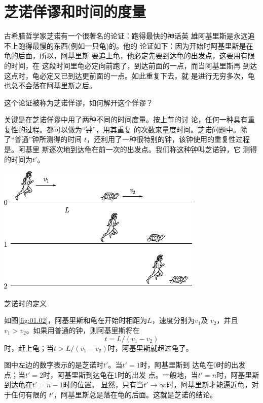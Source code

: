\section{芝诺佯谬和时间的度量}\label{sec:01.02}

古希腊哲学家芝诺有一个很著名的论证：跑得最快的神话英
雄阿基里斯是永远追不上跑得最慢的东西(例如一只龟)的。他的
论证如下：因为开始时阿基里斯是在龟的后面，所以，阿基里斯
要追上龟，他必定先要到达龟的出发点，这要用有限的时间，在
这段时间里龟必定向前跑了，到达前面的一点，而当阿基里斯再
到达这点时，龟必定又已到达更前面的一点。如此重复下去，就
是进行无穷多次，龟也总不会落在阿基里斯之后。

这个论证被称为芝诺佯谬，如何解开这个佯谬？

关键是在芝诺佯谬中用了两种不同的时间度量。按上节的讨
论，任何一种具有重复性的过程。都可以做为“钟”，用其重复
的次数来量度时间。芝诺问题中。除了“普通”钟所测得的时间
$t$，还利用了一种很特别的钟，该钟使用的重复性过程是。阿基里
斯逐次地到达龟在前一次的出发点。我们称这种钟叫芝诺钟，它
测得的时间为$t'$。

\begin{figurex}[!h]
    \centering
    \includegraphics{figure/fig01.02}
    \caption{芝诺时的定义}
    \label{fig:01.02}
\end{figurex}

如图\ref{fig:01.02}，阿基里斯和龟在开始时相距为$L$，速度分别为$v_1$及
$v_2$，并且$v_1>v_2$。如果用普通的钟，则阿基里斯将在
\begin{equation}
    t=L/\left(v_1-v_2\right)
    \label{eqn:01.02.01}
\end{equation}
时，赶上龟；当$t>L/\left(v_1-v_2\right)$时，阿基里斯就超过龟了。

图中左边的数字表示的是芝诺时$t'$。当$t'=1$时，阿基里斯到
达龟在0时的出发点；当$t'=2$时，阿基里斯到达龟在1时的出发
点。一般地，当$t'=n$时，阿基里斯到达龟在$t'=n-1$时的位置。
显然，只有当$t'\rightarrow\infty$时，阿基里斯才能逼近龟，对于任何有限的
$t'$，阿基里斯总是落在龟的后面。这就是芝诺的结论。


